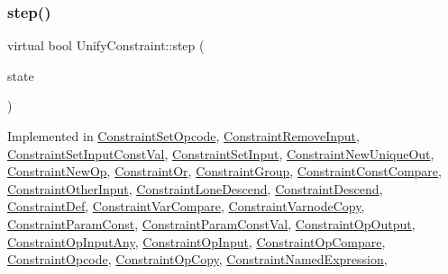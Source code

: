 \subsubsection{\texorpdfstring{step()}{step()}}
{\footnotesize\ttfamily virtual bool Unify\+Constraint\+::step (\begin{DoxyParamCaption}\item[{\mbox{\hyperlink{class_unify_state}{Unify\+State}} \&}]{state }\end{DoxyParamCaption})\hspace{0.3cm}{\ttfamily [pure virtual]}}



Implemented in \mbox{\hyperlink{class_constraint_set_opcode_a673db34a5b11dc6e004f481d0cccac9e}{Constraint\+Set\+Opcode}}, \mbox{\hyperlink{class_constraint_remove_input_a8ca6138d7f67a2eb97ad988aeb57d54a}{Constraint\+Remove\+Input}}, \mbox{\hyperlink{class_constraint_set_input_const_val_a998952417cd5325d8ba5b6a912dd1b05}{Constraint\+Set\+Input\+Const\+Val}}, \mbox{\hyperlink{class_constraint_set_input_afe2320ca9a36a19fec3bcfaa7130c0ca}{Constraint\+Set\+Input}}, \mbox{\hyperlink{class_constraint_new_unique_out_a164256b52634fe6d5a858a601845dfe5}{Constraint\+New\+Unique\+Out}}, \mbox{\hyperlink{class_constraint_new_op_a53678f806d79236bb280167323593063}{Constraint\+New\+Op}}, \mbox{\hyperlink{class_constraint_or_a04ec591e6f9106bfbdbf9bf76e773aea}{Constraint\+Or}}, \mbox{\hyperlink{class_constraint_group_aeb75604b690052150d7a94392677dd20}{Constraint\+Group}}, \mbox{\hyperlink{class_constraint_const_compare_abbb5ae34af8b206328c9dd9147fd6824}{Constraint\+Const\+Compare}}, \mbox{\hyperlink{class_constraint_other_input_af89c902f186ba083e4fd4b54efcc551a}{Constraint\+Other\+Input}}, \mbox{\hyperlink{class_constraint_lone_descend_a792c77fd74feb948f4fcf8f3ce57b4f3}{Constraint\+Lone\+Descend}}, \mbox{\hyperlink{class_constraint_descend_aa5b4c0fb09d4231c8ac20e95cfbaaae4}{Constraint\+Descend}}, \mbox{\hyperlink{class_constraint_def_acd26c5907c37a243b7edee01ce9b358d}{Constraint\+Def}}, \mbox{\hyperlink{class_constraint_var_compare_a730b6edfacbee486efdea1e91b6509cd}{Constraint\+Var\+Compare}}, \mbox{\hyperlink{class_constraint_varnode_copy_afa111c6ea8baf57393ba9d503612e036}{Constraint\+Varnode\+Copy}}, \mbox{\hyperlink{class_constraint_param_const_a938ee0ec5d67dd37947de4fb59a225bf}{Constraint\+Param\+Const}}, \mbox{\hyperlink{class_constraint_param_const_val_aab6146036d543edc207f16a75532f0b7}{Constraint\+Param\+Const\+Val}}, \mbox{\hyperlink{class_constraint_op_output_aec6f2bec6b741072d41d44edb4308aa3}{Constraint\+Op\+Output}}, \mbox{\hyperlink{class_constraint_op_input_any_a319f53489a8bea35df0359d26dc5f547}{Constraint\+Op\+Input\+Any}}, \mbox{\hyperlink{class_constraint_op_input_ad3db5bd9dd80ffb0492f0ffd11acd19c}{Constraint\+Op\+Input}}, \mbox{\hyperlink{class_constraint_op_compare_ad3e51a4ae74aa157e112f2aa85f23781}{Constraint\+Op\+Compare}}, \mbox{\hyperlink{class_constraint_opcode_adab0b976a316fe14cfd1f6169a2d6fe3}{Constraint\+Opcode}}, \mbox{\hyperlink{class_constraint_op_copy_aae93c891f29b393a21aad701e665f63b}{Constraint\+Op\+Copy}}, \mbox{\hyperlink{class_constraint_named_expression_a630676872d5064310afad5d63fa5aea8}{Constraint\+Named\+Expression}}, 